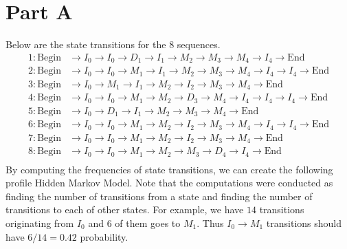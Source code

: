 \documentclass[12pt]{article}
\begin{document}
\section*{Part A}
Below are the state transitions for the $8$ sequences.
\begin{align*}
    1 : \text{Begin} & \rightarrow I_0 \rightarrow I_0 \rightarrow D_1 \rightarrow I_1 \rightarrow M_2 \rightarrow M_3  \rightarrow M_4\rightarrow I_4 \rightarrow \text{End}\\
    2 : \text{Begin} & \rightarrow I_0 \rightarrow I_0 \rightarrow M_1\rightarrow I_1 \rightarrow M_2 \rightarrow M_3  \rightarrow M_4\rightarrow I_4 \rightarrow I_4 \rightarrow\text{End}\\
    3 : \text{Begin} & \rightarrow I_0 \rightarrow M_1\rightarrow I_1 \rightarrow M_2 \rightarrow I_2 \rightarrow M_3  \rightarrow M_4\rightarrow \text{End}\\
    4 : \text{Begin} & \rightarrow I_0 \rightarrow I_0 \rightarrow M_1\rightarrow M_2 \rightarrow D_3 \rightarrow M_4\rightarrow I_4 \rightarrow I_4 \rightarrow I_4 \rightarrow\text{End}\\
    5 : \text{Begin} & \rightarrow I_0 \rightarrow D_1 \rightarrow I_1 \rightarrow M_2 \rightarrow M_3  \rightarrow M_4 \rightarrow \text{End}\\
    6 : \text{Begin} & \rightarrow I_0 \rightarrow I_0 \rightarrow M_1\rightarrow M_2 \rightarrow I_2 \rightarrow M_3  \rightarrow M_4\rightarrow I_4 \rightarrow I_4 \rightarrow\text{End}\\
    7 : \text{Begin} & \rightarrow I_0 \rightarrow I_0 \rightarrow M_1\rightarrow M_2 \rightarrow I_2\rightarrow M_3  \rightarrow M_4\rightarrow \text{End}\\
    8 : \text{Begin} & \rightarrow I_0 \rightarrow I_0 \rightarrow M_1\rightarrow M_2 \rightarrow M_3  \rightarrow D_4\rightarrow I_4 \rightarrow\text{End}\\
\end{align*}
By computing the frequencies of state transitions, we can create the following profile Hidden Markov Model. Note that the computations were conducted as finding the number of transitions from a state and finding the number of transitions to each of other states. For example, we have $14$ transitions originating from $I_0$ and $6$ of them goes to $M_1$. Thus $I_0\rightarrow M_1$ transitions should have $6/14=0.42$ probability.\\
\end{document}
